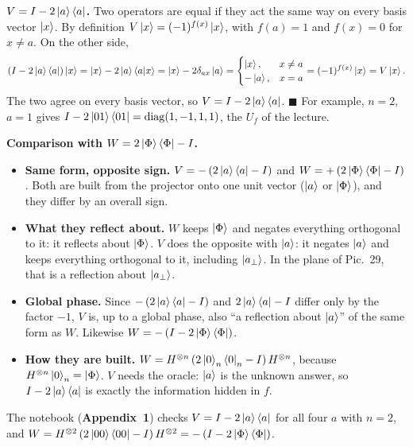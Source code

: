 \documentclass[a4paper, 10pt]{article}
\begin{document}
\begin{solution}
	\noindent \textbf{\( V = I - 2\ket{a}\bra{a} \).} Two operators are equal if they act the same way on every basis vector \( \ket{x} \). By definition \( V\ket{x} = (-1)^{f(x)}\ket{x} \), with \( f(a) = 1 \) and \( f(x) = 0 \) for \( x \neq a \). On the other side,
	\[
		\left(I - 2\ket{a}\bra{a}\right)\ket{x} = \ket{x} - 2\ket{a}\braket{a \vert x} = \ket{x} - 2\delta_{ax}\ket{a}
		= \begin{cases}
			\ket{x},  & x \neq a \\
			-\ket{a}, & x = a
		\end{cases}
		= (-1)^{f(x)}\ket{x} = V\ket{x}.
	\]
	The two agree on every basis vector, so \( V = I - 2\ket{a}\bra{a} \). \( \blacksquare \) For example, \( n = 2 \), \( a = 1 \) gives \( I - 2\ket{01}\bra{01} = \mathrm{diag}(1, -1, 1, 1) \), the \( U_f \) of the lecture.

	\noindent \textbf{Comparison with \( W = 2\ket{\Phi}\bra{\Phi} - I \).}
	\begin{itemize}
		\item \textbf{Same form, opposite sign.} \( V = -\left(2\ket{a}\bra{a} - I\right) \) and \( W = +\left(2\ket{\Phi}\bra{\Phi} - I\right) \). Both are built from the projector onto one unit vector (\( \ket{a} \) or \( \ket{\Phi} \)), and they differ by an overall sign.
		\item \textbf{What they reflect about.} \( W \) keeps \( \ket{\Phi} \) and negates everything orthogonal to it: it reflects about \( \ket{\Phi} \). \( V \) does the opposite with \( \ket{a} \): it negates \( \ket{a} \) and keeps everything orthogonal to it, including \( \ket{a_\perp} \). In the plane of Pic.~29, that is a reflection about \( \ket{a_\perp} \).
		\item \textbf{Global phase.} Since \( -\left(2\ket{a}\bra{a} - I\right) \) and \( 2\ket{a}\bra{a} - I \) differ only by the factor \( -1 \), \( V \) is, up to a global phase, also ``a reflection about \( \ket{a} \)'' of the same form as \( W \). Likewise \( W = -\left(I - 2\ket{\Phi}\bra{\Phi}\right) \).
		\item \textbf{How they are built.} \( W = H^{\otimes n}\left(2\ket{0}_n\bra{0}_n - I\right)H^{\otimes n} \), because \( H^{\otimes n}\ket{0}_n = \ket{\Phi} \). \( V \) needs the oracle: \( \ket{a} \) is the unknown answer, so \( I - 2\ket{a}\bra{a} \) is exactly the information hidden in \( f \).
	\end{itemize}
	The notebook (\textbf{Appendix~1}) checks \( V = I - 2\ket{a}\bra{a} \) for all four \( a \) with \( n = 2 \), and \( W = H^{\otimes 2}\left(2\ket{00}\bra{00} - I\right)H^{\otimes 2} = -\left(I - 2\ket{\Phi}\bra{\Phi}\right) \).
\end{solution}
\end{document}
